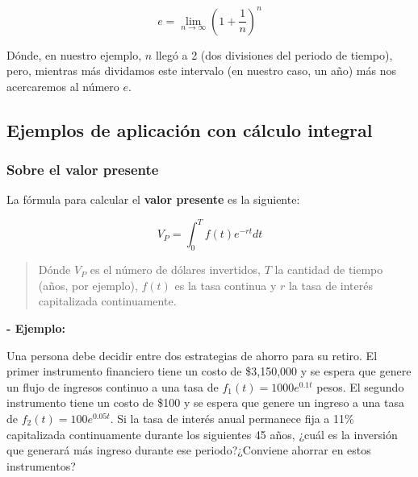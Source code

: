 \documentclass{article}
\begin{document}
            \begin{equation}
                e=\lim _{n \rightarrow \infty}\left(1+\frac{1}{n}\right)^{n}
            \end{equation}

            Dónde, en nuestro ejemplo, $n$ llegó a 2 (dos divisiones del periodo de tiempo), pero, mientras más dividamos este intervalo (en nuestro caso, un año) más nos acercaremos al número $e$.

            \subsection{Ejemplos de aplicación con cálculo integral}

                \subsubsection{Sobre el valor presente}

                    La fórmula para calcular el \textbf{valor presente} es la siguiente:

                    \begin{equation}
                        V_P=\int_{0}^{T} f(t) e^{-r t} d t
                    \end{equation}

                    \begin{quote}
                        Dónde $V_P$ es el número de dólares invertidos, $T$ la cantidad de tiempo (años, por ejemplo), $f(t)$ es la tasa continua y $r$ la tasa de interés capitalizada continuamente.
                    \end{quote}

                    \textbf{- Ejemplo:}

                    Una persona debe decidir entre dos estrategias de ahorro para su retiro. El primer instrumento financiero tiene un costo de \$3,150,000 y se espera que genere un flujo de ingresos continuo a una tasa de $f_{1}(t)=1000e^{0.1t}$ pesos. El segundo instrumento tiene un costo de \$100 y se espera que genere un ingreso a una tasa de $f_{2}(t)=100e^{0.05t}$. Si la tasa de interés anual permanece fija a 11\% capitalizada continuamente durante los siguientes 45 años, ¿cuál es la inversión que generará más ingreso durante ese periodo?¿Conviene ahorrar en estos instrumentos?
                        
\end{document}
